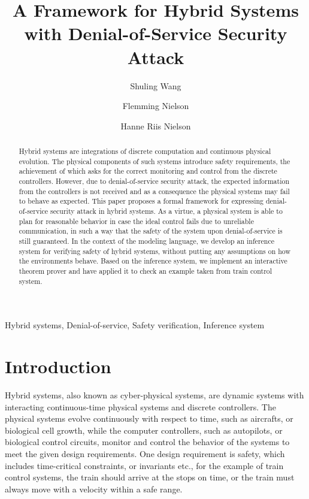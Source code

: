 \documentclass{llncs}
\begin{document}
\title{A Framework for Hybrid Systems with Denial-of-Service Security Attack}
\author{Shuling Wang \and Flemming Nielson
\and Hanne Riis Nielson 
  }



\maketitle

\begin{abstract}
Hybrid systems are integrations of discrete computation and continuous physical evolution. The physical components of such systems
introduce safety requirements, the achievement of which asks for the correct monitoring and
control from the discrete controllers. However, due to denial-of-service security attack,
the expected information from the controllers is not received and
as a consequence the physical systems may fail to behave as expected. This paper
proposes a formal framework for expressing denial-of-service  security attack
 in hybrid systems.  As a virtue, a physical system is able to
plan for reasonable behavior in case the ideal control fails due to unreliable communication,
 in such a way that the safety of the system upon denial-of-service is still guaranteed.
 In the context of the modeling language, we develop an inference system
for verifying safety of hybrid systems, without putting any assumptions on how the environments behave.
Based on the inference system, we implement an interactive theorem prover and have applied
it to check an example taken from train control system.
\end{abstract}
\keywords Hybrid systems,  Denial-of-service,  Safety verification, Inference system
\section{Introduction}

Hybrid systems, also known as cyber-physical systems, are dynamic systems
with interacting continuous-time physical systems and discrete controllers.
The physical systems evolve continuously with respect to time, such as
aircrafts, or  biological cell growth,  while
the computer controllers, such as autopilots, or biological control circuits, monitor and control
the behavior of the systems to meet the given design requirements. One design requirement is safety, which
includes time-critical constraints,  or invariants etc.,  for the example of train control systems,
the train should arrive at the stops on time, or
the train must always move with a velocity within a safe range.
\end{document}
